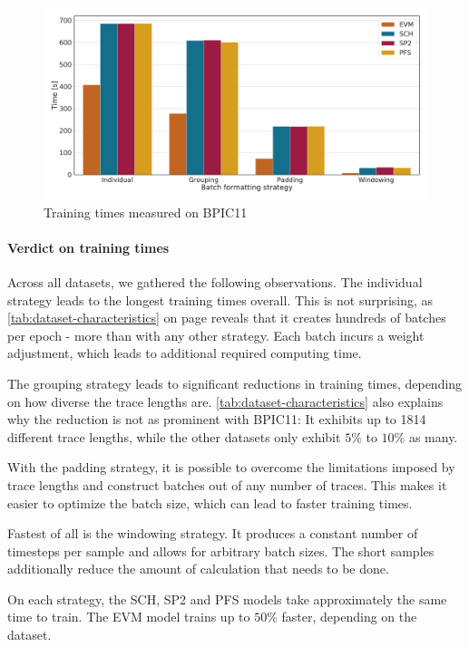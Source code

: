 \begin{figure}[!htb]
    \centering
    \includegraphics[width=\textwidth]{gfx/bpic2011/train_timings.pdf}
    \caption{Training times measured on BPIC11}
    \label{fig:BPIC11-training-timings}
\end{figure}

\paragraph{Verdict on training times}
Across all datasets, we gathered the following observations.
The individual strategy leads to the longest training times overall.
This is not surprising, as \autoref{tab:dataset-characteristics} on page \pageref{tab:dataset-characteristics} reveals that it creates hundreds of batches per epoch - more than with any other strategy.
Each batch incurs a weight adjustment, which leads to additional required computing time.

The grouping strategy leads to significant reductions in training times, depending on how diverse the trace lengths are. \autoref{tab:dataset-characteristics} also explains why the reduction is not as prominent with BPIC11: It exhibits up to 1814 different trace lengths, while the other datasets only exhibit $5\%$ to $10\%$ as many.

With the padding strategy, it is possible to overcome the limitations imposed by trace lengths and construct batches out of any number of traces. This makes it easier to optimize the batch size, which can lead to faster training times.

Fastest of all is the windowing strategy.
It produces a constant number of timesteps per sample and allows for arbitrary batch sizes.
The short samples additionally reduce the amount of calculation that needs to be done.

On each strategy, the SCH, SP2 and PFS models take approximately the same time to train.
The EVM model trains up to $50\%$ faster, depending on the dataset.
\FloatBarrier

